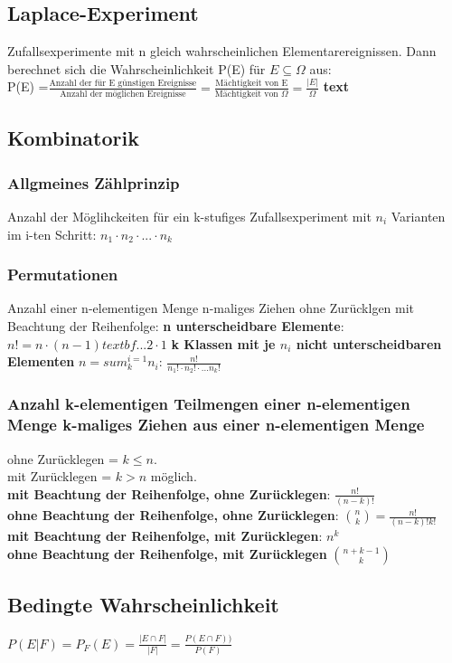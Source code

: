   \subsection{Laplace-Experiment}
  Zufallsexperimente mit n gleich wahrscheinlichen Elementarereignissen. Dann berechnet sich die Wahrscheinlichkeit P(E) für $E \subseteq \Omega$ aus:\\
  P(E) =$\frac{\text{Anzahl der für E günstigen Ereignisse}}{\text{Anzahl der möglichen Ereignisse}} = \frac{\text{Mächtigkeit von E}}{\text{Mächtigkeit von } \Omega} = \frac{|E|}{\Omega}$
  \textbf{text}
  \subsection{Kombinatorik}
  \subsubsection{Allgmeines Zählprinzip}
  Anzahl der Möglihckeiten für ein k-stufiges Zufallsexperiment mit $n_{i}$ Varianten im i-ten Schritt:
  $n_{1} \cdot n_{2} \cdot \text{...} \cdot n_{k}$
  \subsubsection{Permutationen}
  Anzahl einer n-elementigen Menge n-maliges Ziehen ohne Zurücklgen mit Beachtung der Reihenfolge: \textbf{n unterscheidbare Elemente}: $n! = n \cdot(n-1) textbf{...} 2 \cdot 1$
  \textbf{k Klassen mit je $n_{i}$ nicht unterscheidbaren Elementen} $n = sum_{k }^{i=1} n_{i}$:
  $\frac{n!}{n_{1}! \cdot n_{2}!\cdot \text{...}n_{k}! }$
  \subsubsection{Anzahl k-elementigen Teilmengen einer n-elementigen Menge k-maliges Ziehen aus einer n-elementigen Menge}
  ohne Zurücklegen = $k\le n$.\\
  mit Zurücklegen = $ k > n$ möglich.\\
  \textbf{mit Beachtung der Reihenfolge, ohne Zurücklegen}: $\frac{n!}{(n-k)!}$\\
  \textbf{ohne Beachtung  der Reihenfolge, ohne Zurücklegen}: $\binom{n}{k} = \frac{n!}{(n-k)! k!}$\\
  \textbf{mit Beachtung der Reihenfolge, mit Zurücklegen}: $n^k$\\
  \textbf{ohne Beachtung der Reihenfolge, mit Zurücklegen} $\binom{n+k-1}{k}$
  \subsection{Bedingte Wahrscheinlichkeit}
  $P(E|F) = P_{F}(E) = \frac{|E \cap F| }{|F|} = \frac{P(E\cap F))}{P(F)}$
